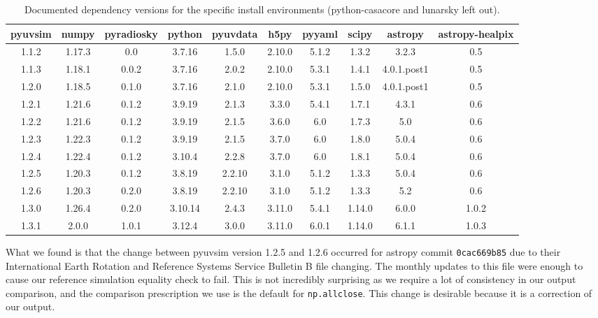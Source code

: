 \documentclass[]{article}
\begin{document}
\begin{table}
\label{tab:ver}
\begin{tabular}{| c | c c c c c c c c c |} \hline
pyuvsim & numpy & pyradiosky & python & pyuvdata & h5py & pyyaml & scipy & astropy & astropy-healpix \\ \hline
1.1.2 & 1.17.3 & 0.0 & 3.7.16 & 1.5.0 & 2.10.0 & 5.1.2 & 1.3.2 & 3.2.3 & 0.5 \\ \hline
1.1.3 & 1.18.1 & 0.0.2 & 3.7.16 & 2.0.2 & 2.10.0 & 5.3.1 & 1.4.1 & 4.0.1.post1 & 0.5 \\ \hline
1.2.0 & 1.18.5 & 0.1.0 & 3.7.16 & 2.1.0 & 2.10.0 & 5.3.1 & 1.5.0 & 4.0.1.post1 & 0.5 \\ \hline
1.2.1 & 1.21.6 & 0.1.2 & 3.9.19 & 2.1.3 & 3.3.0 & 5.4.1 & 1.7.1 & 4.3.1 & 0.6 \\ \hline
1.2.2 & 1.21.6 & 0.1.2 & 3.9.19 & 2.1.5 & 3.6.0 & 6.0 & 1.7.3 & 5.0 & 0.6 \\ \hline
1.2.3 & 1.22.3 & 0.1.2 & 3.9.19 & 2.1.5 & 3.7.0 & 6.0 & 1.8.0 & 5.0.4 & 0.6 \\ \hline
1.2.4 & 1.22.4 & 0.1.2 & 3.10.4 & 2.2.8 & 3.7.0 & 6.0 & 1.8.1 & 5.0.4 & 0.6 \\ \hline
1.2.5 & 1.20.3 & 0.1.2 & 3.8.19 & 2.2.10 & 3.1.0 & 5.1.2 & 1.3.3 & 5.0.4 & 0.6 \\ \hline
1.2.6 & 1.20.3 & 0.2.0 & 3.8.19 & 2.2.10 & 3.1.0 & 5.1.2 & 1.3.3 & 5.2 & 0.6 \\ \hline
1.3.0 & 1.26.4 & 0.2.0 & 3.10.14 & 2.4.3 & 3.11.0 & 5.4.1 & 1.14.0 & 6.0.0 & 1.0.2 \\ \hline
1.3.1 & 2.0.0 & 1.0.1 & 3.12.4 & 3.0.0 & 3.11.0 & 6.0.1 & 1.14.0 & 6.1.1 & 1.0.3 \\ \hline
\end{tabular}
\caption{Documented dependency versions for the specific install environments (python-casacore and lunarsky left out).}
\label{tab:comp}
\end{table}

What we found is that the change between pyuvsim version 1.2.5 and 1.2.6 occurred for astropy commit \verb|0cac669b85| due to their International Earth Rotation and Reference Systems Service Bulletin B file changing. The monthly updates to this file were enough to cause our reference simulation equality check to fail. This is not incredibly surprising as we require a lot of consistency in our output comparison, and the comparison prescription we use is the default for \verb|np.allclose|. This change is desirable because it is a correction of our output.
\end{document}
